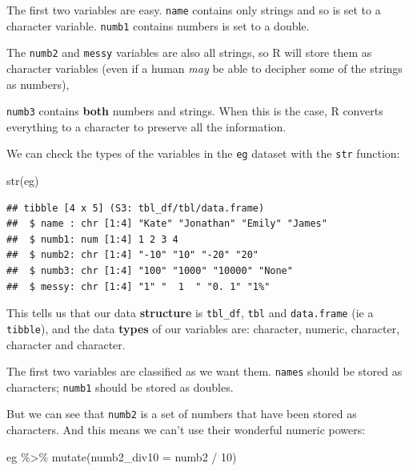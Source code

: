 \documentclass[
]{book}
\newenvironment{Shaded}{\begin{snugshade}}{\end{snugshade}}
\newcommand{\AttributeTok}[1]{\textcolor[rgb]{0.77,0.63,0.00}{#1}}
\newcommand{\DecValTok}[1]{\textcolor[rgb]{0.00,0.00,0.81}{#1}}
\newcommand{\FunctionTok}[1]{\textcolor[rgb]{0.00,0.00,0.00}{#1}}
\newcommand{\NormalTok}[1]{#1}
\newcommand{\SpecialCharTok}[1]{\textcolor[rgb]{0.00,0.00,0.00}{#1}}
\begin{document}
The first two variables are easy.
\texttt{name} contains only strings and so is set to a character variable.
\texttt{numb1} contains numbers is set to a double.

The \texttt{numb2} and \texttt{messy} variables are also all strings, so R will store them as character variables (even if a human \emph{may} be able to decipher some of the strings as numbers),

\texttt{numb3} contains \textbf{both} numbers and strings. When this is the case, R converts everything to a character to preserve all the information.

We can check the types of the variables in the \texttt{eg} dataset with the \texttt{str} function:

\begin{Shaded}
\begin{Highlighting}[]
\FunctionTok{str}\NormalTok{(eg)}
\end{Highlighting}
\end{Shaded}

\begin{verbatim}
## tibble [4 x 5] (S3: tbl_df/tbl/data.frame)
##  $ name : chr [1:4] "Kate" "Jonathan" "Emily" "James"
##  $ numb1: num [1:4] 1 2 3 4
##  $ numb2: chr [1:4] "-10" "10" "-20" "20"
##  $ numb3: chr [1:4] "100" "1000" "10000" "None"
##  $ messy: chr [1:4] "1" "  1  " "0. 1" "1%"
\end{verbatim}

This tells us that our data \textbf{structure} is \texttt{tbl\_df}, \texttt{tbl} and \texttt{data.frame} (ie a \texttt{tibble}), and the data \textbf{types} of our variables are: character, numeric, character, character and character.

The first two variables are classified as we want them. \texttt{names} should be stored as characters; \texttt{numb1} should be stored as doubles.

But we can see that \texttt{numb2} is a set of numbers that have been stored as characters. And this means we can't use their wonderful numeric powers:

\begin{Shaded}
\begin{Highlighting}[]
\NormalTok{eg }\SpecialCharTok{\%\textgreater{}\%} 
  \FunctionTok{mutate}\NormalTok{(}\AttributeTok{numb2\_div10 =}\NormalTok{ numb2 }\SpecialCharTok{/} \DecValTok{10}\NormalTok{)}
\end{Highlighting}
\end{Shaded}
\end{document}
